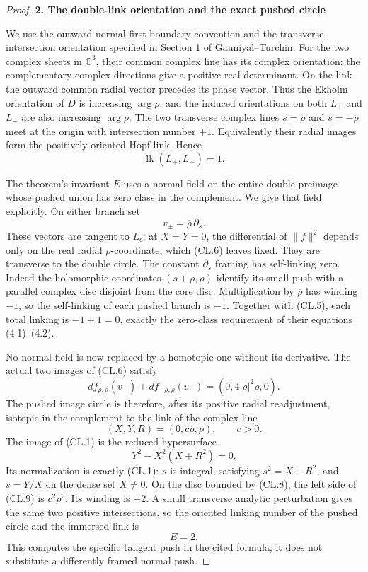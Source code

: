 \begin{proof}
\medskip\noindent\textbf{2. The double-link orientation and the exact pushed circle}

\par\nobreak

We use the outward-normal-first boundary convention and the transverse
intersection orientation specified in Section 1 of Gauniyal--Turchin.
For the two complex sheets in \(\mathbb C^3\), their common complex
line has its complex orientation: the complementary complex directions
give a positive real determinant. On the link the outward common radial
vector precedes its phase vector. Thus the Ekholm orientation of \(D\)
is increasing \(\arg\rho\), and the induced orientations on both
\(L_+\) and \(L_-\) are also increasing \(\arg\rho\).
The two transverse complex lines \(s=\rho\) and \(s=-\rho\) meet at
the origin with intersection number \(+1\). Equivalently their radial
images form the positively oriented Hopf link. Hence
\[
                         \operatorname{lk}(L_+,L_-)=1.            \tag{CL.5}
\]

The theorem's invariant \(E\) uses a normal field on the entire double
preimage whose pushed union has zero class in the complement. We give
that field explicitly. On either branch set
\[
                         v_\pm=\overline\rho\,\partial_s.         \tag{CL.6}
\]
These vectors are tangent to \(L_\epsilon\): at \(X=Y=0\), the
differential of \(\|f\|^2\) depends only on the real radial
\(\rho\)-coordinate, which (CL.6) leaves fixed. They are transverse
to the double circle. The constant \(\partial_s\) framing has
self-linking zero. Indeed the holomorphic coordinates
\((s\mp\rho,\rho)\) identify its small push with a parallel complex
disc disjoint from the core disc. Multiplication by \(\overline\rho\)
has winding \(-1\), so the self-linking of each pushed branch is
\(-1\). Together with (CL.5), each total linking is
\(-1+1=0\), exactly the zero-class requirement of their equations
(4.1)--(4.2).

No normal field is now replaced by a homotopic one without its derivative.
The actual two images of (CL.6) satisfy
\[
 df_{\rho,\rho}(v_+)+df_{-\rho,\rho}(v_-)
                    =(0,4|\rho|^2\rho,0).                       \tag{CL.7}
\]
The pushed image circle is therefore, after its positive radial
readjustment, isotopic in the complement to the link of the complex line
\[
                         (X,Y,R)=(0,c\rho,\rho),\qquad c>0.       \tag{CL.8}
\]
The image of (CL.1) is the reduced hypersurface
\[
                         Y^2-X^2(X+R^2)=0.                      \tag{CL.9}
\]
Its normalization is exactly (CL.1): \(s\) is integral, satisfying
\(s^2=X+R^2\), and \(s=Y/X\) on the dense set \(X\ne0\).
On the disc bounded by (CL.8), the left side of (CL.9) is
\(c^2\rho^2\). Its winding is \(+2\). A small transverse analytic
perturbation gives the same two positive intersections, so the oriented
linking number of the pushed circle and the immersed link is
\[
                                  E=2.                           \tag{CL.10}
\]
This computes the specific tangent push in the cited formula; it does
not substitute a differently framed normal push.


\end{proof}
